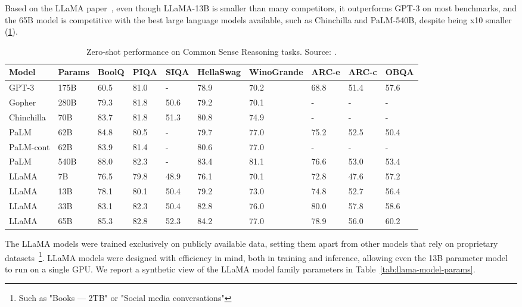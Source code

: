 Based on the LLaMA paper~\cite{touvron2023llama}, even though LLaMA-13B is smaller than many competitors, it outperforms GPT-3 on most benchmarks, and the 65B model is competitive with the best large language models available, such as Chinchilla and PaLM-540B, despite being x10 smaller (\ref{tab:llama-zero-shot-performance}).

\begin{table}[htbp]
    \centering
    \scriptsize
    \caption{Zero-shot performance on Common Sense Reasoning tasks. Source: \protect\cite{touvron2023llama}. }
    \label{tab:llama-zero-shot-performance}
    \begin{tabularx}{\textwidth}{@{}lXXXXXXXXX@{}}
        \toprule
        Model    & Params & BoolQ & PIQA & SIQA & HellaSwag & WinoGrande & ARC-e & ARC-c & OBQA \\
        \midrule
        GPT-3      & 175B   & 60.5  & 81.0 & -    & 78.9      & 70.2       & 68.8  & 51.4  & 57.6 \\
        Gopher     & 280B   & 79.3  & 81.8 & 50.6 & 79.2      & 70.1       & -     & -     & -    \\
        Chinchilla & 70B    & 83.7  & 81.8 & 51.3 & 80.8      & 74.9       & -     & -     & -    \\
        PaLM       & 62B    & 84.8  & 80.5 & -    & 79.7      & 77.0       & 75.2  & 52.5  & 50.4 \\
        PaLM-cont  & 62B    & 83.9  & 81.4 & -    & 80.6      & 77.0       & -     & -     & -    \\
        PaLM       & 540B   & 88.0  & 82.3 & -    & 83.4      & 81.1       & 76.6  & 53.0  & 53.4 \\
        \addlinespace
        LLaMA      & 7B     & 76.5  & 79.8 & 48.9 & 76.1      & 70.1       & 72.8  & 47.6  & 57.2 \\
        LLaMA      & 13B    & 78.1  & 80.1 & 50.4 & 79.2      & 73.0       & 74.8  & 52.7  & 56.4 \\
        LLaMA      & 33B    & 83.1  & 82.3 & 50.4 & 82.8      & 76.0       & 80.0  & 57.8  & 58.6 \\
        LLaMA      & 65B    & 85.3  & 82.8 & 52.3 & 84.2      & 77.0       & 78.9  & 56.0  & 60.2 \\
        \bottomrule
    \end{tabularx}
\end{table}

The LLaMA models were trained exclusively on publicly available data, setting them apart from other models that rely on proprietary datasets~\footnote{Such as "Books --- 2TB" or "Social media conversations"}.
LLaMA models were designed with efficiency in mind, both in training and inference, allowing even the 13B parameter model to run on a single GPU\@.
We report a synthetic view of the LLaMA model family parameters in Table~\ref{tab:llama-model-params}.

